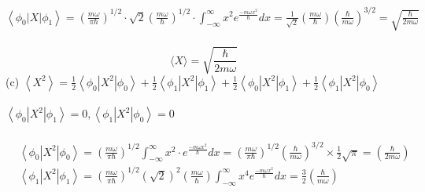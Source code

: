 \begin{enumerate}
\begin{answer}
$\left\langle\phi_{0}|X| \phi_{1}\right\rangle=\left(\frac{m \omega}{\pi \hbar}\right)^{1 / 2} \cdot \sqrt{2}\left(\frac{m \omega}{\hbar}\right)^{1 / 2} \cdot \int_{-\infty}^{\infty} x^{2} e^{\frac{-m \omega x^{2}}{\hbar}} d x=\frac{1}{\sqrt{2}}\left(\frac{m \omega}{\hbar}\right)\left(\frac{\hbar}{m \omega}\right)^{3 / 2}=\sqrt{\frac{\hbar}{2 m \omega}}$\\\\
$$\langle X\rangle=\sqrt{\frac{\hbar}{2 m \omega}}$$
(c) $\left\langle X^{2}\right\rangle=\frac{1}{2}\left\langle\phi_{0}\left|X^{2}\right| \phi_{0}\right\rangle+\frac{1}{2}\left\langle\phi_{1}\left|X^{2}\right| \phi_{1}\right\rangle+\frac{1}{2}\left\langle\phi_{0}\left|X^{2}\right| \phi_{1}\right\rangle+\frac{1}{2}\left\langle\phi_{1}\left|X^{2}\right| \phi_{0}\right\rangle$\\\\
$\left\langle\phi_{0}\left|X^{2}\right| \phi_{1}\right\rangle=0,\left\langle\phi_{1}\left|X^{2}\right| \phi_{0}\right\rangle=0$	\\\\
\begin{align*}
	&\left\langle\phi_{0}\left|X^{2}\right| \phi_{0}\right\rangle=\left(\frac{m \omega}{\pi \hbar}\right)^{1 / 2} \int_{-\infty}^{\infty} x^{2} \cdot e^{\frac{-m \omega x^{2}}{\hbar}} d x=\left(\frac{m \omega}{\pi \hbar}\right)^{1 / 2}\left(\frac{\hbar}{m \omega}\right)^{3 / 2} \times \frac{1}{2} \sqrt{\pi}=\left(\frac{\hbar}{2 m \omega}\right) \\
	&\left\langle\phi_{1}\left|X^{2}\right| \phi_{1}\right\rangle=\left(\frac{m \omega}{\pi \hbar}\right)^{1 / 2}(\sqrt{2})^{2}\left(\frac{m \omega}{\hbar}\right) \int_{-\infty}^{\infty} x^{4} e^{\frac{-m \omega x^{2}}{\hbar}} d x=\frac{3}{2}\left(\frac{\hbar}{m \omega}\right)
\end{align*}


\end{answer}
\end{enumerate}

